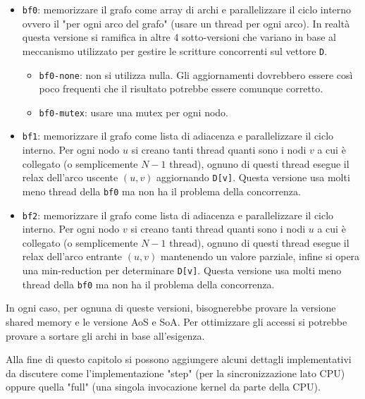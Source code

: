 \documentclass[a4paper]{article}
\begin{document}
	\begin{itemize}
		\item \texttt{bf0}: memorizzare il grafo come array di archi e parallelizzare il ciclo interno ovvero il "per ogni arco del grafo" (usare un thread per ogni arco). In realtà questa versione si ramifica in altre 4 sotto-versioni che variano in base al meccanismo utilizzato per gestire le scritture concorrenti sul vettore \texttt{D}.
		\begin{itemize}
			\item \texttt{bf0-none}: non si utilizza nulla. Gli aggiornamenti dovrebbero essere così poco frequenti che il risultato potrebbe essere comunque corretto.
			\item \texttt{bf0-mutex}: usare una mutex per ogni nodo.
		\end{itemize}
	
		\item \texttt{bf1}: memorizzare il grafo come lista di adiacenza e parallelizzare il ciclo interno. Per ogni nodo $u$ si creano tanti thread quanti sono i nodi $v$ a cui è collegato (o semplicemente $N-1$ thread), ognuno di questi thread esegue il relax dell'arco uscente $(u,v)$ aggiornando \texttt{D[v]}. Questa versione usa molti meno thread della \texttt{bf0} ma non ha il problema della concorrenza.
		
		\item \texttt{bf2}: memorizzare il grafo come lista di adiacenza e parallelizzare il ciclo interno. Per ogni nodo $v$ si creano tanti thread quanti sono i nodi $u$ a cui è collegato (o semplicemente $N-1$ thread), ognuno di questi thread esegue il relax dell'arco entrante $(u,v)$ mantenendo un valore parziale, infine si opera una min-reduction per determinare \texttt{D[v]}. Questa versione usa molti meno thread della \texttt{bf0} ma non ha il problema della concorrenza.
	\end{itemize}

	In ogni caso, per ognuna di queste versioni, bisognerebbe provare la versione shared memory e le versione AoS e SoA. Per ottimizzare gli accessi si potrebbe provare a sortare gli archi in base all'esigenza.
	
	Alla fine di questo capitolo si possono aggiungere alcuni dettagli implementativi da discutere come l'implementazione "step" (per la sincronizzazione lato CPU) oppure quella "full" (una singola invocazione kernel da parte della CPU).
	
\end{document}
